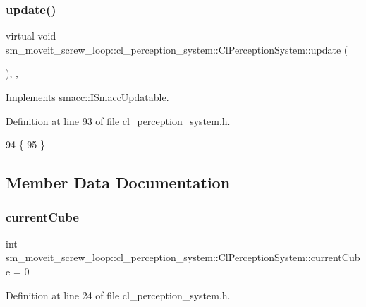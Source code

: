 \subsubsection{\texorpdfstring{update()}{update()}}
{\footnotesize\ttfamily virtual void sm\+\_\+moveit\+\_\+screw\+\_\+loop\+::cl\+\_\+perception\+\_\+system\+::\+Cl\+Perception\+System\+::update (\begin{DoxyParamCaption}{ }\end{DoxyParamCaption})\hspace{0.3cm}{\ttfamily [inline]}, {\ttfamily [override]}, {\ttfamily [virtual]}}



Implements \hyperlink{classsmacc_1_1ISmaccUpdatable_a84ee0520cbefdb1d412bed54650b028e}{smacc\+::\+I\+Smacc\+Updatable}.



Definition at line 93 of file cl\+\_\+perception\+\_\+system.\+h.


\begin{DoxyCode}
94             \{
95             \}
\end{DoxyCode}


\subsection{Member Data Documentation}
\mbox{\label{classsm__moveit__screw__loop_1_1cl__perception__system_1_1ClPerceptionSystem_a21d95597754f74b644602b8697bb07dc}} 
\subsubsection{\texorpdfstring{current\+Cube}{currentCube}}
{\footnotesize\ttfamily int sm\+\_\+moveit\+\_\+screw\+\_\+loop\+::cl\+\_\+perception\+\_\+system\+::\+Cl\+Perception\+System\+::current\+Cube = 0}



Definition at line 24 of file cl\+\_\+perception\+\_\+system.\+h.

